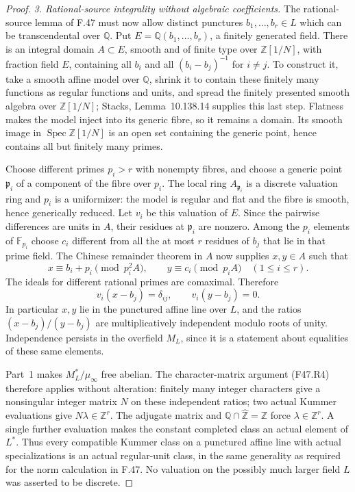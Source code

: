 \begin{proof}
\emph{3. Rational-source integrality without algebraic coefficients.}
The rational-source lemma of F.47 must now allow distinct punctures
$b_1,\ldots,b_r\in L$ which can be transcendental over $\mathbb Q$.
Put $E=\mathbb Q(b_1,\ldots,b_r)$, a finitely generated field.
There is an integral domain $A\subset E$, smooth and of finite
type over $\mathbb Z[1/N]$, with fraction field $E$, containing
all $b_i$ and all $(b_i-b_j)^{-1}$ for $i\ne j$. To construct it,
take a smooth affine model over $\mathbb Q$, shrink it to contain
these finitely many functions as regular functions and units, and
spread the finitely presented smooth algebra over $\mathbb Z[1/N]$;
Stacks, Lemma~10.138.14 \citep{StacksSmoothSpread} supplies this
last step. Flatness makes the model inject into its generic fibre,
so it remains a domain. Its smooth image in
$\operatorname{Spec}\mathbb Z[1/N]$ is an open set containing the
generic point, hence contains all but finitely many primes.

Choose different primes $p_i>r$ with nonempty fibres, and choose
a generic point $\mathfrak p_i$ of a component of the fibre over
$p_i$. The local ring $A_{\mathfrak p_i}$ is a discrete valuation
ring and $p_i$ is a uniformizer: the model is regular and flat and
the fibre is smooth, hence generically reduced. Let $v_i$ be this
valuation of $E$. Since the pairwise differences are units in
$A$, their residues at $\mathfrak p_i$ are nonzero. Among the
$p_i$ elements of $\mathbb F_{p_i}$ choose $c_i$ different from
all the at most $r$ residues of $b_j$ that lie in that prime field.
The Chinese remainder theorem in $A$ now supplies $x,y\in A$
such that
\[
 x\equiv b_i+p_i\pmod{p_i^2A},\qquad
 y\equiv c_i\pmod{p_iA}\quad(1\le i\le r).
\]
The ideals for different rational primes are comaximal. Therefore
\[
 v_i(x-b_j)=\delta_{ij},\qquad v_i(y-b_j)=0.                \tag{F50.4}
\]
In particular $x,y$ lie in the punctured affine line over $L$,
and the ratios $(x-b_j)/(y-b_j)$ are multiplicatively independent
modulo roots of unity. Independence persists in the overfield
$M_L$, since it is a statement about equalities of these same
elements.

Part~1 makes $M_L^*/\mu_\infty$ free abelian. The character-matrix
argument (F47.R4) therefore applies without alteration: finitely
many integer characters give a nonsingular integer matrix $N$ on
these independent ratios; two actual Kummer evaluations give
$N\lambda\in\mathbb Z^r$. The adjugate matrix and
$\mathbb Q\cap\widehat{\mathbb Z}=\mathbb Z$ force
$\lambda\in\mathbb Z^r$. A single further evaluation makes the
constant completed class an actual element of $L^*$.
Thus every compatible Kummer class on a punctured affine line
with actual specializations is an actual regular-unit class, in
the same generality as required for the norm calculation in F.47.
No valuation on the possibly much larger field $L$ was asserted
to be discrete.


\end{proof}
